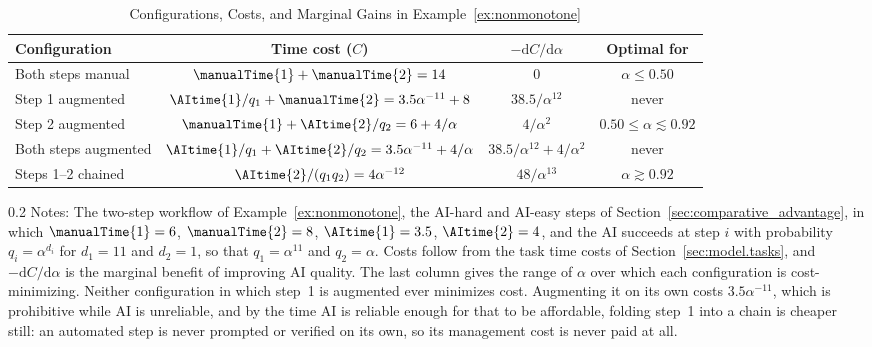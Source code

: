 \begin{table}[!t]
\centering
\caption{Configurations, Costs, and Marginal Gains in Example~\ref{ex:nonmonotone}}
\label{tab:nonmonotone_costs}
\singlespacing
\footnotesize
\setlength{\tabcolsep}{10pt}
\begin{tabular}{lccc}
\toprule
Configuration & Time cost ($C$) & $-\mathrm{d}C/\mathrm{d}\alpha$ & Optimal for \\
\midrule
Both steps manual & $\manualTime{1} + \manualTime{2} = 14$ & $0$ & $\alpha \leq 0.50$ \\
\midrule
Step 1 augmented & $\AItime{1}/q_1 + \manualTime{2} = 3.5\alpha^{-11} + 8$ & $38.5/\alpha^{12}$ & never \\
\midrule
Step 2 augmented & $\manualTime{1} + \AItime{2}/q_2 = 6 + 4/\alpha$ & $4/\alpha^{2}$ & $0.50 \leq \alpha \lesssim 0.92$ \\
\midrule
Both steps augmented & $\AItime{1}/q_1 + \AItime{2}/q_2 = 3.5\alpha^{-11} + 4/\alpha$ & $38.5/\alpha^{12} + 4/\alpha^{2}$ & never \\
\midrule
Steps 1--2 chained & $\AItime{2}/(q_1 q_2) = 4\alpha^{-12}$ & $48/\alpha^{13}$ & $\alpha \gtrsim 0.92$ \\
\bottomrule
\end{tabular}
\par\vspace{\fignotesskip}
\begin{minipage}{1\linewidth}
\begin{spacing}{0.2}
{\fontsize{9.5pt}{10pt}\selectfont Notes: The two-step workflow of Example~\ref{ex:nonmonotone}, the AI-hard and AI-easy steps of Section~\ref{sec:comparative_advantage}, in which $\manualTime{1}=6$, $\manualTime{2}=8$, $\AItime{1}=3.5$, $\AItime{2}=4$, and the AI succeeds at step $i$ with probability $q_i = \alpha^{d_i}$ for $d_1 = 11$ and $d_2 = 1$, so that $q_1 = \alpha^{11}$ and $q_2 = \alpha$.
Costs follow from the task time costs of Section~\ref{sec:model.tasks}, and $-\mathrm{d}C/\mathrm{d}\alpha$ is the marginal benefit of improving AI quality.
The last column gives the range of $\alpha$ over which each configuration is cost-minimizing.
Neither configuration in which step~1 is augmented ever minimizes cost.
Augmenting it on its own costs $3.5\alpha^{-11}$, which is prohibitive while AI is unreliable, and by the time AI is reliable enough for that to be affordable, folding step~1 into a chain is cheaper still: an automated step is never prompted or verified on its own, so its management cost is never paid at all.}
\end{spacing}
\end{minipage}
\end{table}
